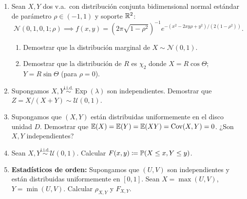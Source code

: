 \begin{enumerate}
\begin{enumerate}[label=(\alph*)]
        \end{enumerate}
  \item Sean $X, Y$ dos v.a.\ con distribución conjunta bidimensional normal estándar de parámetro $\rho \in (-1, 1)$ y soporte $\mathbb{R}^2$:
        \[
          \mathcal{N}(0, 1, 0, 1; \rho) \implies f(x,y) = \left(2\pi\sqrt{1-\rho^2}\right)^{-1} e^{-(x^2 - 2xy\rho + y^2)/(2(1-\rho^2))}.
        \]
        \begin{enumerate}[label=(\alph*)]
          \item Demostrar que la distribución marginal de $X \sim \mathcal{N}(0,1)$.
          \item Demostrar que la distribución de $R$ es $\chi_2$ donde $X = R\cos\Theta$; $Y = R\sin\Theta$ (para $\rho = 0$).
        \end{enumerate}
  \item Supongamos $X, Y \stackrel{\text{i.i.d.}}{\sim} \operatorname{Exp}(\lambda)$ son independientes. Demostrar que $Z = X/(X + Y) \sim \mathcal{U}(0,1)$.
  \item Supongamos que $(X, Y)$ están distribuidas uniformemente en el disco unidad $D$. Demostrar que $\mathbb{E}(X) = \mathbb{E}(Y) = \mathbb{E}(XY) = \operatorname{Cov}(X,Y) = 0$. ¿Son $X, Y$ independientes?
  \item Sean $X, Y \stackrel{\text{i.i.d.}}{\sim} \mathcal{U}(0,1)$. Calcular $F(x,y) \coloneqq \mathbb{P}(X \le x, Y \le y)$.
  \item \textbf{Estadísticos de orden:} Supongamos que $(U, V)$ son independientes y están distribuidas uniformemente en $[0, 1]$. Sean $X = \max(U, V)$, $Y = \min(U, V)$. Calcular $\rho_{X,Y}$ y $F_{X,Y}$.
\end{enumerate}
